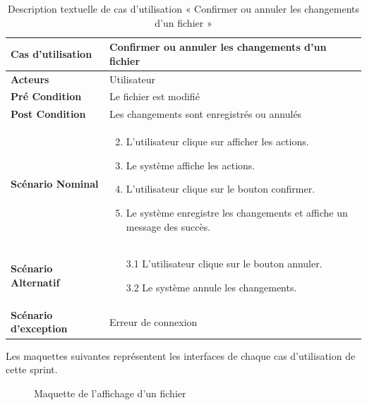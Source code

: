 \begin{longtable}{|p{5cm}|p{10cm}|}
  \caption{Description textuelle de cas d'utilisation « Confirmer ou annuler les changements d'un fichier »} \label{tab:description-textuelle-de-cas-d-utilisation-confirmer-ou-annuler-les-changements-d-un-fichier} \\
\hline
\textbf{Cas d'utilisation}&Confirmer ou annuler les changements d'un fichier\\
\hline
\textbf{Acteurs}&Utilisateur\\
\hline
\textbf{Pré Condition}&Le fichier est modifié\\
\hline
\textbf{Post Condition}&Les changements sont enregistrés ou annulés\\
\hline
\textbf{Scénario Nominal}&
\vspace{-\baselineskip}
\begin{enumerate}
    \setcounter{enumi}{1}
    \item L'utilisateur clique sur afficher les actions.
    \item Le système affiche les actions.
    \item L'utilisateur clique sur le bouton confirmer.
    \item Le système enregistre les changements et affiche un message des succès.
\end{enumerate}\\
\hline
\textbf{Scénario Alternatif}&
\vspace{-\baselineskip}
\begin{enumerate}
    \item [3.1]L'utilisateur clique sur le bouton annuler.
    \item [3.2]Le système annule les changements.
\end{enumerate}\\
\hline
\textbf{Scénario d'exception}&Erreur de connexion\\
\hline

\end{longtable}


Les maquettes suivantes représentent les interfaces de chaque cas d'utilisation de cette sprint. \\

\begin{figure}[H]
  \centering
  \caption{Maquette de l'affichage d'un fichier}
  \label{fig:design_file_preview}
\end{figure}

